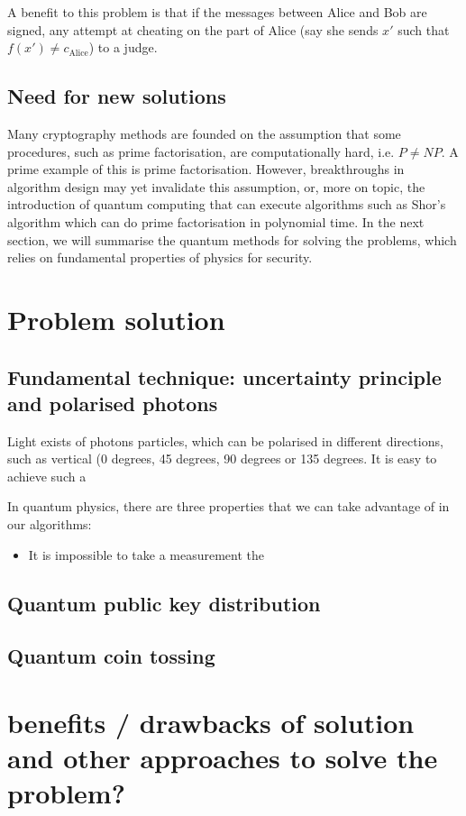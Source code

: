 \documentclass[oneside,a4paper]{article}
\begin{document}
A benefit to this problem is that if the messages between Alice and Bob are signed, any attempt at cheating on the part of Alice (say she sends $x'$ such that $f(x') \neq c_{\text{Alice}}$) to a judge.


\subsection{Need for new solutions}
Many cryptography methods are founded on the assumption that some procedures, such as prime factorisation, are computationally hard, i.e. $P \neq NP$.
A prime example of this is prime factorisation.
However, breakthroughs in algorithm design may yet invalidate this assumption, or, more on topic, the introduction of quantum computing that can execute algorithms such as Shor's algorithm which can do prime factorisation in polynomial time.
In the next section, we will summarise the quantum methods for solving the problems, which relies on fundamental properties of physics for security.

\section{Problem solution}

\subsection{Fundamental technique: uncertainty principle and polarised photons}
Light exists of photons particles, which can be polarised in different directions, such as vertical (0 degrees, 45 degrees, 90 degrees or 135 degrees.
It is easy to achieve such a 


In quantum physics, there are three properties that we can take advantage of in our algorithms:

\begin{itemize}
    \item It is impossible to take a measurement the
\end{itemize}

\subsection{Quantum public key distribution}


\subsection{Quantum coin tossing}

\section{benefits / drawbacks of solution  and other approaches to solve the problem?}




\end{document}
